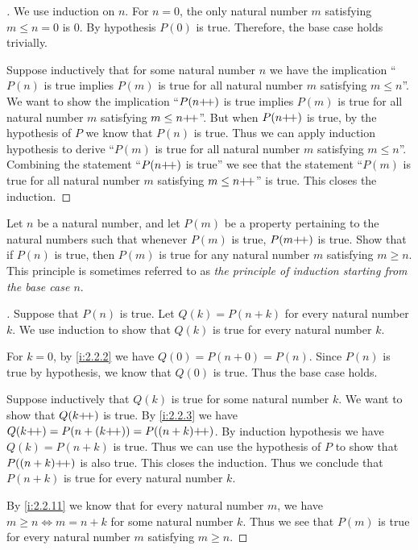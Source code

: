\begin{proof}[]
  We use induction on \(n\).
  For \(n = 0\), the only natural number \(m\) satisfying \(m \leq n = 0\) is \(0\).
  By hypothesis \(P(0)\) is true.
  Therefore, the base case holds trivially.

  Suppose inductively that for some natural number \(n\) we have the implication ``\(P(n)\) is true implies \(P(m)\) is true for all natural number \(m\) satisfying \(m \leq n\)''.
  We want to show the implication ``\(P(n{+}\!{+})\) is true implies \(P(m)\) is true for all natural number \(m\) satisfying \(m \leq n{+}\!{+}\)''.
  But when \(P(n{+}\!{+})\) is true, by the hypothesis of \(P\) we know that \(P(n)\) is true.
  Thus we can apply induction hypothesis to derive ``\(P(m)\) is true for all natural number \(m\) satisfying \(m \leq n\)''.
  Combining the statement ``\(P(n{+}\!{+})\) is true'' we see that the statement ``\(P(m)\) is true for all natural number \(m\) satisfying \(m \leq n{+}\!{+}\)'' is true.
  This closes the induction.
\end{proof}

\begin{ex}\label{i:ex:2.2.7}
  Let \(n\) be a natural number, and let \(P(m)\) be a property pertaining to the natural numbers such that whenever \(P(m)\) is true, \(P(m{+}\!{+})\) is true.
  Show that if \(P(n)\) is true, then \(P(m)\) is true for any natural number \(m\) satisfying \(m \geq n\).
  This principle is sometimes referred to as \emph{the principle of induction starting from the base case \(n\)}.
\end{ex}

\begin{proof}[]
  Suppose that \(P(n)\) is true.
  Let \(Q(k) = P(n + k)\) for every natural number \(k\).
  We use induction to show that \(Q(k)\) is true for every natural number \(k\).

  For \(k = 0\), by \cref{i:2.2.2} we have \(Q(0) = P(n + 0) = P(n)\).
  Since \(P(n)\) is true by hypothesis, we know that \(Q(0)\) is true.
  Thus the base case holds.

  Suppose inductively that \(Q(k)\) is true for some natural number \(k\).
  We want to show that \(Q(k{+}\!{+})\) is true.
  By \cref{i:2.2.3} we have \(Q(k{+}\!{+}) = P(n + (k{+}\!{+})) = P((n + k){+}\!{+})\).
  By induction hypothesis we have \(Q(k) = P(n + k)\) is true.
  Thus we can use the hypothesis of \(P\) to show that \(P((n + k){+}\!{+})\) is also true.
  This closes the induction.
  Thus we conclude that \(P(n + k)\) is true for every natural number \(k\).

  By \cref{i:2.2.11} we know that for every natural number \(m\), we have \(m \geq n \iff m = n + k\) for some natural number \(k\).
  Thus we see that \(P(m)\) is true for every natural number \(m\) satisfying \(m \geq n\).
\end{proof}
